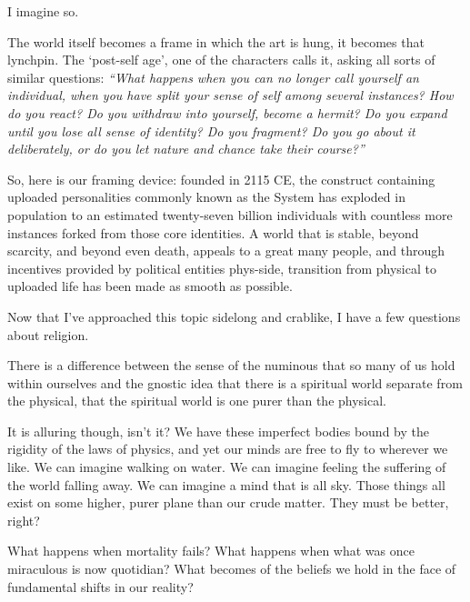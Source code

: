 I imagine so.

The world itself becomes a frame in which the art is hung, it becomes that lynchpin. The `post-self age', one of the characters calls it, asking all sorts of similar questions: \emph{``What happens when you can no longer call yourself an individual, when you have split your sense of self among several instances? How do you react? Do you withdraw into yourself, become a hermit? Do you expand until you lose all sense of identity? Do you fragment? Do you go about it deliberately, or do you let nature and chance take their course?''}

So, here is our framing device: founded in 2115 CE, the construct containing uploaded personalities commonly known as the System has exploded in population to an estimated twenty-seven billion individuals with countless more instances forked from those core identities. A world that is stable, beyond scarcity, and beyond even death, appeals to a great many people, and through incentives provided by political entities phys-side, transition from physical to uploaded life has been made as smooth as possible.

Now that I've approached this topic sidelong and crablike, I have a few questions about religion.

There is a difference between the sense of the numinous that so many of us hold within ourselves and the gnostic idea that there is a spiritual world separate from the physical, that the spiritual world is one purer than the physical.

It is alluring though, isn't it? We have these imperfect bodies bound by the rigidity of the laws of physics, and yet our minds are free to fly to wherever we like. We can imagine walking on water. We can imagine feeling the suffering of the world falling away. We can imagine a mind that is all sky. Those things all exist on some higher, purer plane than our crude matter. They must be better, right?

What happens when mortality fails? What happens when what was once miraculous is now quotidian? What becomes of the beliefs we hold in the face of fundamental shifts in our reality?

